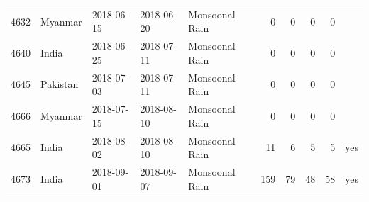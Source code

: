 \begin{tabular}{rllllrrrrl}
4632 & Myanmar & 2018-06-15 & 2018-06-20 & Monsoonal Rain & 0 & 0 & 0 & 0 &  \\
4640 & India & 2018-06-25 & 2018-07-11 & Monsoonal Rain & 0 & 0 & 0 & 0 &  \\
4645 & Pakistan & 2018-07-03 & 2018-07-11 & Monsoonal Rain & 0 & 0 & 0 & 0 &  \\
4666 & Myanmar & 2018-07-15 & 2018-08-10 & Monsoonal Rain & 0 & 0 & 0 & 0 &  \\
4665 & India & 2018-08-02 & 2018-08-10 & Monsoonal Rain & 11 & 6 & 5 & 5 & yes \\
4673 & India & 2018-09-01 & 2018-09-07 & Monsoonal Rain & 159 & 79 & 48 & 58 & yes \\
\bottomrule\end{tabular}